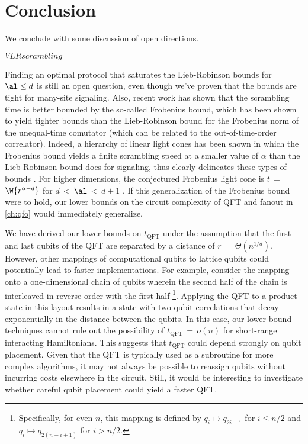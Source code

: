 \chapter{Conclusion}
We conclude with some discussion of open directions.

$VLR scrambling$

Finding an optimal protocol that saturates the Lieb-Robinson bounds for $\al \le d$ is still an open question, even though we've proven that the bounds are tight for many-site signaling.
Also, recent work has shown that the scrambling time is better bounded by the so-called Frobenius bound, which has been shown to yield tighter bounds than the Lieb-Robinson bound for the Frobenius norm of the unequal-time comutator (which can be related to the out-of-time-order correlator). Indeed, a hierarchy of linear light cones has been shown in which the Frobenius bound yields a finite scrambling speed at a smaller value of $\alpha$ than the Lieb-Robinson bound does for signaling, thus clearly delineates these types of bounds \cite{Tran2020hierarchylinearlightcones}.
For higher dimensions, the conjectured Frobenius light cone is $t$\,$=$\,$\W{r^{\alpha-d}}$ for $d$\,$<$\,$\al$\,$<$\,$d+1$ \cite{Chen2021Frobenius}.
If this generalization of the Frobenius bound were to hold, our lower bounds on the circuit complexity of QFT and fanout in \cref{ch:qfo} would immediately generalize.


We have derived our lower bounds on $t_\textrm{QFT}$ under the assumption that the first and last qubits of the QFT are separated by a distance of $r$\,$=$\,$\Theta(n^{1/d})$.
However, other mappings of computational qubits to lattice qubits could potentially lead to faster implementations.
For example, consider the mapping onto a one-dimensional chain of qubits wherein the second half of the chain is interleaved in reverse order with the first half \footnote{Specifically, for even $n$, this mapping is defined by $q_i\mapsto q_{2i-1}$ for $i \le n/2$ and $q_i\mapsto q_{2(n-i+1)}$ for $i > n/2$.}.
Applying the QFT to a product state in this layout results in a state with two-qubit correlations that decay exponentially in the distance between the qubits.
In this case, our lower bound techniques cannot rule out the possibility of $t_\textrm{QFT}$\,$=$\,$o(n)$ for short-range interacting Hamiltonians.
This suggests that $t_\textrm{QFT}$ could depend strongly on qubit placement.
Given that the QFT is typically used as a subroutine for more complex algorithms, it may not always be possible to reassign qubits without incurring costs elsewhere in the circuit.
Still, it would be interesting to investigate whether careful qubit placement could yield a faster QFT.

